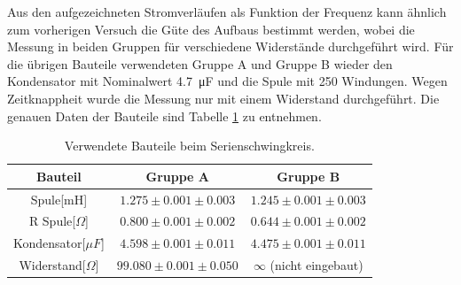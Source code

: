 \documentclass[12pt,a4paper]{article}
\begin{document}
Aus den aufgezeichneten Stromverläufen als Funktion der Frequenz kann ähnlich zum vorherigen Versuch die Güte des Aufbaus bestimmt werden, wobei die Messung in beiden Gruppen für verschiedene Widerstände durchgeführt wird. Für die übrigen Bauteile verwendeten Gruppe A und  Gruppe B wieder den Kondensator mit Nominalwert \SI{4,7}{\micro \F} und die Spule mit 250 Windungen.
Wegen Zeitknappheit wurde die Messung nur mit einem Widerstand durchgeführt. Die genauen Daten der Bauteile sind Tabelle \ref{tab:parallel_Bauteile} zu entnehmen.

\begin{table}
\centering
\begin{tabular}{|c|c|c|}
\hline
Bauteil & Gruppe A & Gruppe B\\
\hline
Spule[mH] & $1.275\pm 0.001\pm 0.003$ & $1.245\pm 0.001\pm 0.003$\\
\hline
R Spule[$\Omega$] & $0.800\pm 0.001\pm 0.002$ & $0.644\pm 0.001\pm 0.002$\\
\hline
Kondensator[$\mu F$] & $4.598\pm 0.001\pm 0.011$ & $4.475\pm 0.001\pm 0.011$\\
\hline
Widerstand[$\Omega$] & $99.080\pm 0.001\pm 0.050$ & $\infty$ (nicht eingebaut)\\
\hline
\end{tabular}
\caption{Verwendete Bauteile beim Serienschwingkreis.}
\label{tab:parallel_Bauteile}
\end{table}
\end{document}
